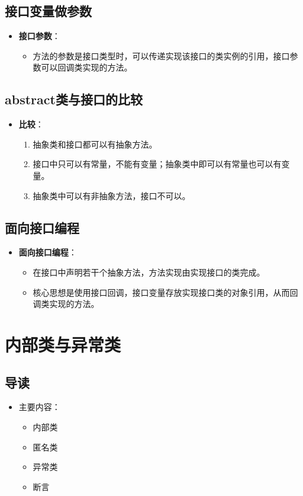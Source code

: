 \documentclass[a4paper, 10pt]{ctexart}
\begin{document}
\subsection{接口变量做参数}
\begin{itemize}
  \item \textbf{接口参数}：
  \begin{itemize}
    \item 方法的参数是接口类型时，可以传递实现该接口的类实例的引用，接口参数可以回调类实现的方法。
  \end{itemize}
\end{itemize}

\subsection{abstract类与接口的比较}
\begin{itemize}
  \item \textbf{比较}：
  \begin{enumerate}
    \item 抽象类和接口都可以有抽象方法。
    \item 接口中只可以有常量，不能有变量；抽象类中即可以有常量也可以有变量。
    \item 抽象类中可以有非抽象方法，接口不可以。
  \end{enumerate}
\end{itemize}

\subsection{面向接口编程}
\begin{itemize}
  \item \textbf{面向接口编程}：
  \begin{itemize}
    \item 在接口中声明若干个抽象方法，方法实现由实现接口的类完成。
    \item 核心思想是使用接口回调，接口变量存放实现接口类的对象引用，从而回调类实现的方法。
  \end{itemize}
\end{itemize}

\section{内部类与异常类}

\subsection{导读}
\begin{itemize}
  \item 主要内容：
  \begin{itemize}
    \item 内部类
    \item 匿名类
    \item 异常类
    \item 断言
  \end{itemize}
\end{itemize}
\end{document}
